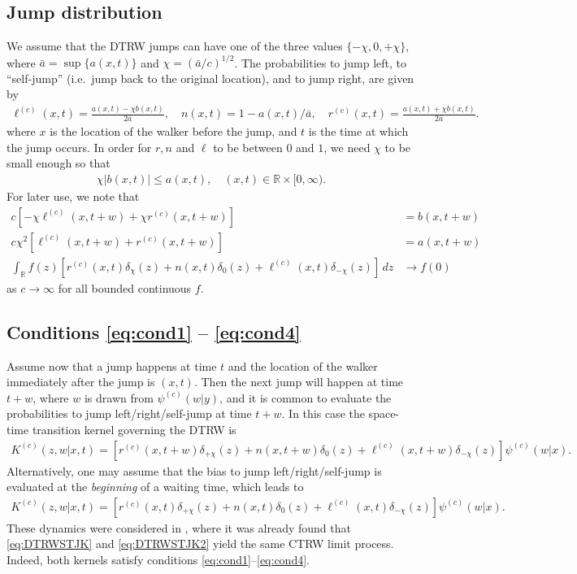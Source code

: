 \documentclass[a4paper,12pt]{elsarticle}
\numberwithin{equation}{section}
\theoremstyle{plain}
\theoremstyle{definition}
\theoremstyle{remark}
\numberwithin{equation}{section}
\newcommand{\spc}{\mathbb R}
\newcommand{\spctim}{\spc \times [0,\infty)}
\newcommand{\1}{\mathbf 1}
\begin{document}
\subsection{Jump distribution}

We assume that the DTRW jumps can have one of the three values
$\{-\chi, 0, +\chi\}$, where $\bar a = \sup\{a(x,t)\}$ and $\chi = (\bar a / c)^{1/2}$.
The probabilities to jump left, to ``self-jump'' (i.e.\ jump back to the
original location), and to jump right, are given by
\begin{gather*}
\ell^{(c)}(x,t) = \frac{a(x,t) - \chi b(x,t)}{2 \bar a},
\quad
n(x,t) = 1 - a(x,t)/\bar a,
\quad
r^{(c)}(x,t) = \frac{a(x,t) + \chi b(x,t)}{2 \bar a}.
\end{gather*}
where $x$ is the location of the walker before the jump, and $t$ is the time at which the jump occurs.
In order for $r, n$ and $\ell$ to be between $0$ and $1$,
we need $\chi$ to be small  enough so that
\begin{align}
  \chi |b(x,t)|  \le a(x,t), \quad (x,t) \in \spctim.
\end{align}
For later use, we note that
\begin{align}
\label{eq:jump-calc-b}
c [-\chi \ell^{(c)}(x,t+w) + \chi r^{(c)}(x,t+w)]
&= b(x,t+w)
\\ \label{eq:jump-calc-a}
c \chi^2 [\ell^{(c)}(x,t+w) + r^{(c)}(x,t+w)] &= a(x,t+w)
\\ \label{eq:jump2delta}
\int_\spc f(z)\left[r^{(c)}(x,t) \delta_\chi(z)
+ n(x,t) \delta_0(z) + \ell^{(c)}(x,t) \delta_{-\chi}(z) \right]\,dz
&\to f(0)
\end{align}
as $c \to \infty$ for all bounded continuous $f$.


\subsection{Conditions \eqref{eq:cond1} -- \eqref{eq:cond4}}

Assume now that a jump happens at time $t$ and the location of the walker immediately after the jump is $(x,t)$.
Then the next jump will happen at time $t+w$, where $w$ is drawn from $\psi^{(c)}(w|y)$, and it is common to evaluate the probabilities to jump left/right/self-jump at time $t+w$.  In this case the space-time transition kernel governing the DTRW is
\begin{align} \label{eq:DTRWSTJK}
  K^{(c)}(z,w|x,t) = \left[r^{(c)}(x,t+w)\delta_{+\chi}(z)
  + n(x, t+w) \delta_0(z)
  + \ell^{(c)}(x, t+w) \delta_{-\chi}(z)\right]
  \psi^{(c)}(w|x).
\end{align}
Alternatively, one may assume that the bias to jump left/right/self-jump is evaluated at the \emph{beginning} of a waiting time, which leads to
\begin{align} \label{eq:DTRWSTJK2}
  K^{(c)}(z,w|x,t) = \left[r^{(c)}(x,t)\delta_{+\chi}(z)
  + n(x, t) \delta_0(z)
  + \ell^{(c)}(x, t) \delta_{-\chi}(z)\right]
  \psi^{(c)}(w|x).
\end{align}
These dynamics were considered in \cite{Angstmann2015}, where it was already found that \eqref{eq:DTRWSTJK} and \eqref{eq:DTRWSTJK2} yield the same CTRW limit process.  Indeed, both kernels satisfy conditions \eqref{eq:cond1}--\eqref{eq:cond4}.
\end{document}
